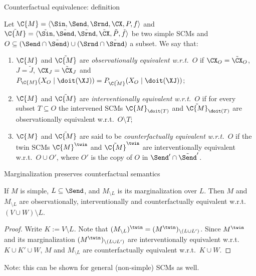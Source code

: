 \begin{frame}{Counterfactual equivalence: definition}
\begin{definition}
  Let $\C{M} = \langle \Sin, \Send, \Srnd, \CX, P, f \rangle$ and
  $\tilde{\C{M}} = \langle \tilde{\Sin}, \tilde{\Send}, \tilde{\Srnd}, \tilde{\CX}, \tilde{P}, \tilde{f} \rangle$ be two simple SCMs
  and $O \subseteq (\Send \cap \tilde{\Send}) \cup (\Srnd \cap \tilde{\Srnd})$ a subset.
  We say that:
  \begin{enumerate}
    \item {\color{gray}$\C{M}$ and $\tilde{\C{M}}$ are \emph{observationally equivalent w.r.t.\ $O$} if $\CX_O = \tilde{\CX}_O$, $J = \tilde{J}$, $\CX_J = \tilde{\CX}_J$ and $P_{\C{M}}(X_O \mid \doit(\XJ)) = P_{\tilde{\C{M}}}(X_O \mid \doit(\XJ))$;}
    \item {\color{gray}$\C{M}$ and $\tilde{\C{M}}$ are \emph{interventionally equivalent w.r.t.\ $O$} if for every subset $T \subseteq O$ the intervened SCMs $\C{M}_{\doit(T)}$ and $\tilde{\C{M}}_{\doit(T)}$ are observationally equivalent w.r.t.\ $O \setminus T$;}
    \item $\C{M}$ and $\tilde{\C{M}}$ are said to be \emph{counterfactually equivalent w.r.t.\ $O$} if the twin SCMs $\C{M}^\twin$ and $\tilde{\C{M}}^\twin$ are interventionally equivalent w.r.t.\ $O \cup O'$, where
  $O'$ is the copy of $O$ in $\Send' \cap \tilde{\Send}'$.
  \end{enumerate}
\end{definition}
\end{frame}

\begin{frame}{Marginalization preserves counterfactual semantics}
\begin{Thm}
  If $M$ is simple, $L \subseteq \Send$, and
  $M_{\setminus L}$ is its marginalization over $L$. Then $M$ and $M_{\setminus L}$ are {\color{gray}observationally,
  interventionally} and counterfactually equivalent w.r.t.\ $(V \cup W) \setminus L$.
\end{Thm}
\begin{proof}
  Write $K := V \setminus L$.
  Note that $(M_{\setminus L})^\twin = (M^\twin)_{\setminus (L \cup L')}$. 
  Since $M^\twin$ and its marginalization
  $(M^\twin)_{\setminus (L \cup L')}$ are interventionally equivalent w.r.t.\ $K \cup K' \cup W$,
  $M$ and $M_{\setminus L}$ are counterfactually equivalent w.r.t.\ $K \cup W$.
\end{proof}
Note: this can be shown for general (non-simple) SCMs as well.
\end{frame}

